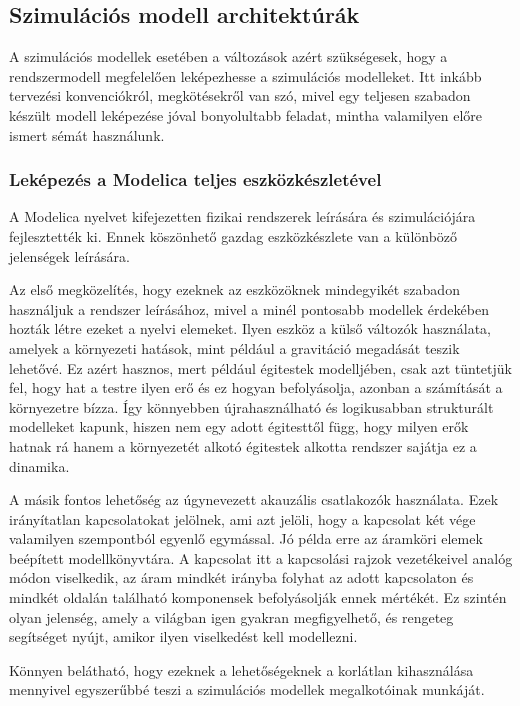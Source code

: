     \subsection{Szimulációs modell architektúrák}
    A szimulációs modellek esetében a változások azért szükségesek, hogy a rendszermodell megfelelően leképezhesse a szimulációs modelleket.
    Itt inkább tervezési konvenciókról, megkötésekről van szó, mivel egy teljesen szabadon készült modell leképezése jóval bonyolultabb feladat, mintha valamilyen előre ismert sémát használunk.

        \subsubsection{Leképezés a Modelica teljes eszközkészletével}
        A Modelica nyelvet kifejezetten fizikai rendszerek leírására és szimulációjára fejlesztették ki.
        Ennek köszönhető gazdag eszközkészlete van a különböző jelenségek leírására.
        
        Az első megközelítés, hogy ezeknek az eszközöknek mindegyikét szabadon használjuk a rendszer leírásához, mivel a minél pontosabb modellek érdekében hozták létre ezeket a nyelvi elemeket.
        Ilyen eszköz a külső változók használata, amelyek a környezeti hatások, mint például a gravitáció megadását teszik lehetővé. Ez azért hasznos, mert például égitestek modelljében, csak azt tüntetjük fel, hogy hat a testre ilyen erő és ez hogyan befolyásolja, azonban a számítását a környezetre bízza. Így könnyebben újrahasználható és logikusabban strukturált modelleket kapunk, hiszen nem egy adott égitesttől függ, hogy milyen erők hatnak rá hanem a környezetét alkotó égitestek alkotta rendszer sajátja ez a dinamika.
        
        A másik fontos lehetőség az úgynevezett akauzális csatlakozók használata. Ezek irányítatlan kapcsolatokat jelölnek, ami azt jelöli, hogy a kapcsolat két vége valamilyen szempontból egyenlő egymással. Jó példa erre az áramköri elemek beépített modellkönyvtára. A kapcsolat itt a kapcsolási rajzok vezetékeivel analóg módon viselkedik, az áram mindkét irányba folyhat az adott kapcsolaton és mindkét oldalán található komponensek befolyásolják ennek mértékét.
        Ez szintén olyan jelenség, amely a világban igen gyakran megfigyelhető, és rengeteg segítséget nyújt, amikor ilyen viselkedést kell modellezni.
        
        Könnyen belátható, hogy ezeknek a lehetőségeknek a korlátlan kihasználása mennyivel egyszerűbbé teszi a szimulációs modellek megalkotóinak munkáját.

